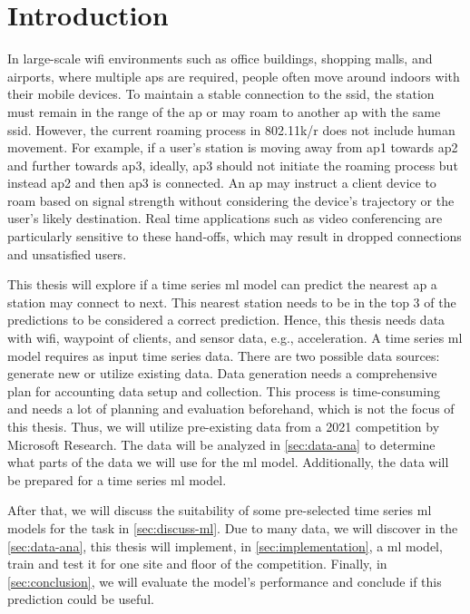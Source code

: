 \chapter{Introduction}\label{sec:intro}

In large-scale \ac{wifi} environments such as office buildings, shopping malls, and airports, where multiple \acp{ap} are required, people often move around indoors with their mobile devices.
To maintain a stable connection to the \ac{ssid}, the station must remain in the range of the \ac{ap} or may roam to another \ac{ap} with the same \ac{ssid}.
However, the current roaming process in 802.11k/r\cite{802.11k}\cite{802.11r} does not include human movement.
For example, if a user's station is moving away from \ac{ap}1 towards \ac{ap}2 and further towards \ac{ap}3, ideally, \ac{ap}3 should not initiate the roaming process but instead \ac{ap}2 and then \ac{ap}3 is connected.
An \ac{ap} may instruct a client device to roam based on signal strength without considering the device's trajectory or the user's likely destination.
Real time applications such as video conferencing are particularly sensitive to these hand-offs, which may result in dropped connections and unsatisfied users.

This thesis will explore if a time series \ac{ml} model can predict the nearest \ac{ap} a station may connect to next.
This nearest station needs to be in the top 3 of the predictions to be considered a correct prediction.
Hence, this thesis needs data with \ac{wifi}, waypoint of clients, and sensor data, e.g., acceleration.
A time series \ac{ml} model requires as input time series data.
There are two possible data sources: generate new or utilize existing data. 
Data generation needs a comprehensive plan for accounting data setup and collection.
This process is time-consuming and needs a lot of planning and evaluation beforehand, which is not the focus of this thesis.
Thus, we will utilize pre-existing data from a 2021 competition by Microsoft Research\cite{IndoorLocationNavigation}.
The data will be analyzed in \cref{sec:data-ana} to determine what parts of the data we will use for the \ac{ml} model.
Additionally, the data will be prepared for a time series \ac{ml} model.

After that, we will discuss the suitability of some pre-selected time series \ac{ml} models for the task in \cref{sec:discuss-ml}. 
Due to many data, we will discover in the \cref{sec:data-ana}, this thesis will implement, in \cref{sec:implementation}, a \ac{ml} model, train and test it for one site and floor of the competition.
Finally, in \cref{sec:conclusion}, we will evaluate the model's performance and conclude if this prediction could be useful.

